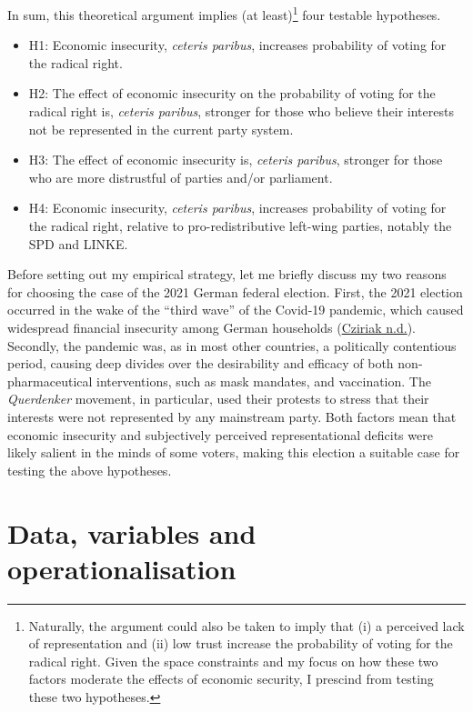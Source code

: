 \documentclass[
]{article}
\providecommand{\tightlist}{%
  \setlength{\itemsep}{0pt}\setlength{\parskip}{0pt}}
\begin{document}
In sum, this theoretical argument implies (at least)\footnote{Naturally,
  the argument could also be taken to imply that (i) a perceived lack of
  representation and (ii) low trust increase the probability of voting
  for the radical right. Given the space constraints and my focus on how
  these two factors moderate the effects of economic security, I
  prescind from testing these two hypotheses.} four testable hypotheses.

\begin{itemize}
\tightlist
\item
  H1: Economic insecurity, \emph{ceteris paribus}, increases probability
  of voting for the radical right.
\item
  H2: The effect of economic insecurity on the probability of voting for
  the radical right is, \emph{ceteris paribus}, stronger for those who
  believe their interests not be represented in the current party
  system.
\item
  H3: The effect of economic insecurity is, \emph{ceteris paribus},
  stronger for those who are more distrustful of parties and/or
  parliament.
\item
  H4: Economic insecurity, \emph{ceteris paribus}, increases probability
  of voting for the radical right, relative to pro-redistributive
  left-wing parties, notably the SPD and LINKE.
\end{itemize}

Before setting out my empirical strategy, let me briefly discuss my two
reasons for choosing the case of the 2021 German federal election.
First, the 2021 election occurred in the wake of the ``third wave'' of
the Covid-19 pandemic, which caused widespread financial insecurity
among German households
(\protect\hyperlink{ref-cziriak_publication_nodate}{Cziriak n.d.}).
Secondly, the pandemic was, as in most other countries, a politically
contentious period, causing deep divides over the desirability and
efficacy of both non-pharmaceutical interventions, such as mask
mandates, and vaccination. The \emph{Querdenker} movement, in
particular, used their protests to stress that their interests were not
represented by any mainstream party. Both factors mean that economic
insecurity and subjectively perceived representational deficits were
likely salient in the minds of some voters, making this election a
suitable case for testing the above hypotheses.

\hypertarget{data-variables-and-operationalisation}{%
\section{Data, variables and
operationalisation}\label{data-variables-and-operationalisation}}
\end{document}
